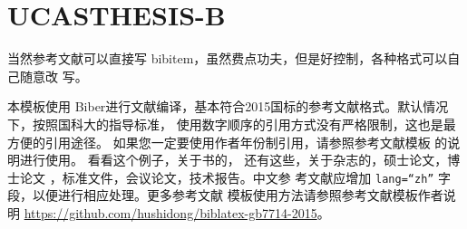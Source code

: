 \documentclass[twoside]{article}
\begin{document}
    \section*{UCASTHESIS-B}

当然参考文献可以直接写 bibitem，虽然费点功夫，但是好控制，各种格式可以自己随意改
写。

本模板使用 Biber进行文献编译，基本符合2015国标的参考文献格式。默认情况下，按照国科大的指导标准，
使用数字顺序的引用方式没有严格限制，这也是最方便的引用途径。 如果您一定要使用作者年份制引用，请参照参考文献模板
的说明进行使用。
看看这个例子，关于书的\cite{tex, companion, ColdSources}，
还有这些\cite{Krasnogor2004e, clzs, zjsw}，关于杂志的\cite{ELIDRISSI94,
  MELLINGER96, SHELL02}，硕士论文\cite{zhubajie, metamori2004}，博士论文
\cite{shaheshang, FistSystem01}，标准文件\cite{IEEE-1363}，会议论文\cite{DPMG,kocher99}，技术报告\cite{NPB2}。中文参
考文献\cite{cnarticle}应增加 \texttt{lang=``zh''} 字段，以便进行相应处理。更多参考文献
模板使用方法请参照参考文献模板作者说明 \url{https://github.com/hushidong/biblatex-gb7714-2015}。

    \printbibliography

    
\end{document}
